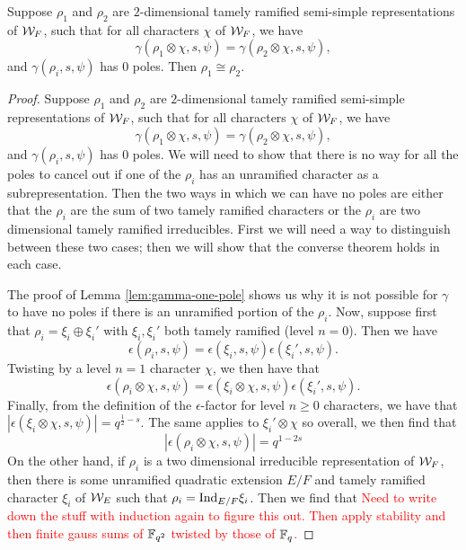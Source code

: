 \begin{lemma}
  \label{lem:gamma-zero-poles}
  Suppose $\rho_1$ and $\rho_2$ are $2$-dimensional tamely ramified semi-simple representations of $\mathcal{W}_F$, such that for all characters $\chi$ of $\mathcal{W}_F$, we have
  \[\gamma(\rho_1 \otimes \chi,s,\psi) = \gamma(\rho_2 \otimes \chi,s,\psi),\]
  and $\gamma(\rho_i,s,\psi)$ has $0$ poles.
  Then $\rho_1 \cong \rho_2$.
\end{lemma}

\begin{proof}
  Suppose $\rho_1$ and $\rho_2$ are $2$-dimensional tamely ramified semi-simple representations of $\mathcal{W}_F$, such that for all characters $\chi$ of $\mathcal{W}_F$, we have
  \[\gamma(\rho_1 \otimes \chi,s,\psi) = \gamma(\rho_2 \otimes \chi,s,\psi),\]
  and $\gamma(\rho_i,s,\psi)$ has $0$ poles.
  We will need to show that there is no way for all the poles to cancel out if one of the $\rho_i$ has an unramified character as a subrepresentation.
  Then the two ways in which we can have no poles are either that the $\rho_i$ are the sum of two tamely ramified characters or the $\rho_i$ are two dimensional tamely ramified irreducibles.
  First we will need a way to distinguish between these two cases; then we will show that the converse theorem holds in each case.

  The proof of Lemma \ref{lem:gamma-one-pole} shows us why it is not possible for $\gamma$ to have no poles if there is an unramified portion of the $\rho_i$.
  Now, suppose first that $\rho_i = \xi_i \oplus \xi_i'$ with $\xi_i,\xi_i'$ both tamely ramified (level $n=0$).
  Then we have
  \[\epsilon(\rho_i,s,\psi) = \epsilon(\xi_i,s,\psi)\epsilon(\xi_i',s,\psi).\]
  Twisting by a level $n=1$ character $\chi$, we then have that
  \[\epsilon(\rho_i \otimes \chi,s,\psi) = \epsilon(\xi_i \otimes \chi,s,\psi) \epsilon(\xi_i',s,\psi).\]
  Finally, from the definition of the $\epsilon$-factor for level $n \geq 0$ characters, we have that $|\epsilon(\xi_i \otimes \chi,s,\psi)| = q^{\frac{1}{2}-s}$.
  The same applies to $\xi_i'\otimes \chi$ so overall, we then find that
  \[|\epsilon(\rho_i \otimes \chi,s,\psi)| = q^{1 - 2s}\]
  On the other hand, if $\rho_i$ is a two dimensional irreducible representation of $\mathcal{W}_F$, then there is some unramified quadratic extension $E/F$ and tamely ramified character $\xi_i$ of $\mathcal{W}_E$ such that $\rho_i = \textrm{Ind}_{E/F} \xi_i$.
  Then we find that \textcolor{red}{Need to write down the stuff with induction again to figure this out.}
  \textcolor{red}{Then apply stability and then finite gauss sums of $\mathbb{F}_{q^2}$ twisted by those of $\mathbb{F}_q$.}
\end{proof}

